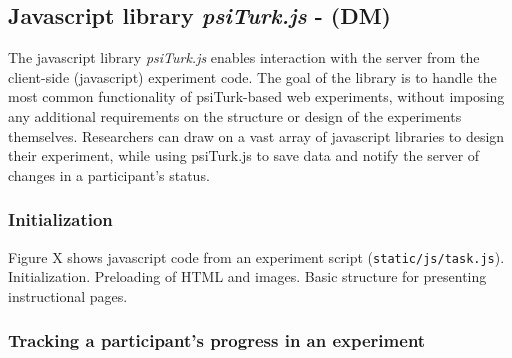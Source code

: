 \documentclass[twocolumn]{svjour3}          %
\begin{document}



%
%
%
%
%



\subsection{Javascript library \emph{psiTurk.js} - (DM)}

The javascript library \emph{psiTurk.js} enables interaction with the server from the client-side (javascript) experiment code.
The goal of the library is to handle the most common functionality of psiTurk-based web experiments, without imposing any additional requirements on the structure or design of the experiments themselves.
Researchers can draw on a vast array of javascript libraries to design their experiment, while using psiTurk.js to save data and notify the server of changes in a participant's status.

\subsubsection{Initialization}

Figure X shows javascript code from an experiment script (\texttt{static/js/task.js}). 
Initialization. 
Preloading of HTML and images.
Basic structure for presenting instructional pages.

\subsubsection{Tracking a participant's progress in an experiment} 
\end{document}
